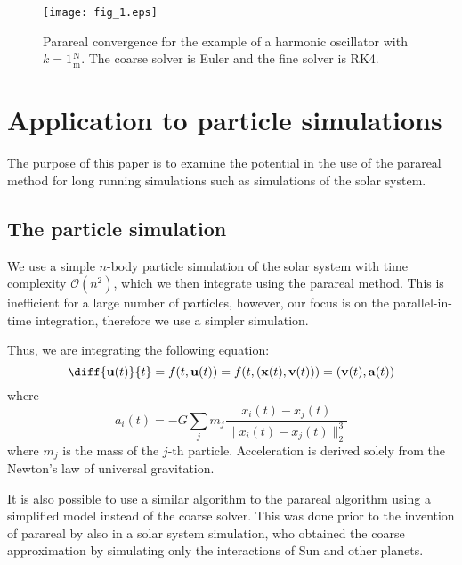 \documentclass[conference]{IEEEtran}
\begin{document}
\begin{figure}[htbp]
\centerline{\texttt{[image: fig\_1.eps]}}
\caption{Parareal convergence for the example of a harmonic oscillator with $k = 1\frac{\text{N}}{\text{m}}$. The coarse solver is Euler and the fine solver is RK4.}
\label{oscillator}
\end{figure}

\section{Application to particle simulations}
The purpose of this paper is to examine the potential in the use of the parareal method for long running simulations such as simulations of the solar system. 

\subsection{The particle simulation}
We use a simple $n$-body particle simulation of the solar system with time complexity $\mathcal{O}(n^2)$, which we then integrate using the parareal method. This is inefficient for a large number of particles, however, our focus is on the parallel-in-time integration, therefore we use a simpler simulation.

Thus, we are integrating the following equation:
$$
\diff{\mathbf{u}(t)}{t} = f(t, \mathbf{u}(t)) = f(t, (\mathbf{x}(t), \mathbf{v}(t))) = (\mathbf{v}(t), \mathbf{a}(t))
$$
where 
$$
a_i(t) = -G \sum_j m_j\frac{x_i(t)-x_j(t)}{\|x_i(t)-x_j(t)\|_2^3}
$$
where $m_j$ is the mass of the $j$-th particle. Acceleration is derived solely from the Newton's law of universal gravitation.

It is also possible to use a similar algorithm to the parareal algorithm using a simplified model instead of the coarse solver. This was done prior to the invention of parareal by \cite{parallelsolar} also in a solar system simulation, who obtained the coarse approximation by simulating only the interactions of Sun and other planets.\cite{parallelsolar}\cite{farfuture}
\end{document}

